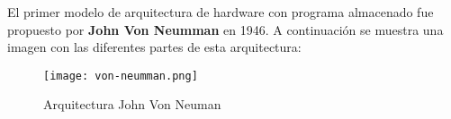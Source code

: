 El primer modelo de arquitectura de hardware con programa almacenado fue propuesto por {\bfseries John Von Neumman} en 1946. A continuación se muestra una imagen con las diferentes partes de esta arquitectura:

\begin{figure}[h]
    \centering
    \texttt{[image: von-neumman.png]}
    \caption{Arquitectura John Von Neuman}
\end{figure}

















\glsaddall
\printglossaries


\newpage
{}



